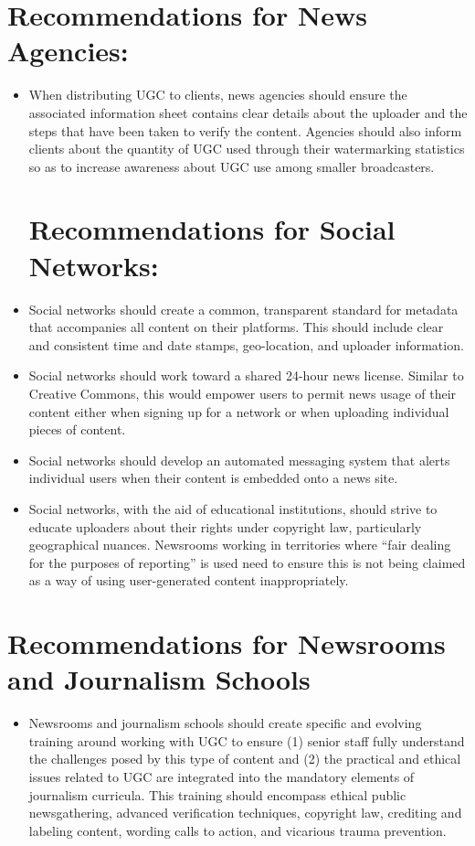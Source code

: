 \documentclass[symmetric, notoc, nobib]{towcenter-book}
\begin{document}
\section{Recommendations for News Agencies:}
\begin{itemize}
\item When distributing UGC to clients, news agencies should ensure
the associated information sheet contains clear details about
the uploader and the steps that have been taken to verify the
content. Agencies should also inform clients about the quantity
of UGC used through their watermarking statistics so as to
increase awareness about UGC use among smaller broadcasters.

\section{Recommendations for Social Networks:}
\item Social networks should create a common, transparent standard
for metadata that accompanies all content on their platforms.
This should include clear and consistent time and date stamps,
geo-location, and uploader information.
\item Social networks should work toward a shared 24-hour news
license. Similar to Creative Commons, this would empower
users to permit news usage of their content either when signing
up for a network or when uploading individual pieces of content.
\item Social networks should develop an automated messaging system
that alerts individual users when their content is embedded onto
a news site.
\item Social networks, with the aid of educational institutions, should
strive to educate uploaders about their rights under copyright
law, particularly geographical nuances. Newsrooms working in
territories where ``fair dealing for the purposes of reporting'' is
used need to ensure this is not being claimed as a way of using
user-generated content inappropriately.
\end{itemize}

\section{Recommendations for Newsrooms and Journalism Schools}
\begin{itemize}
\item Newsrooms and journalism schools should create specific and
evolving training around working with UGC to ensure (1) senior
staff fully understand the challenges posed by this type of content
and (2) the practical and ethical issues related to UGC are
integrated into the mandatory elements of journalism curricula.
This training should encompass ethical public newsgathering,
advanced verification techniques, copyright law, crediting
and labeling content, wording calls to action, and vicarious
trauma prevention.
\end{itemize}
\end{document}
